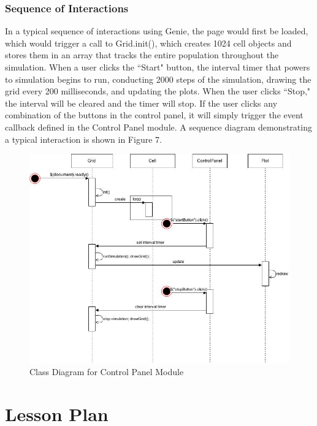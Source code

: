 \documentclass[12pt]{article}
\begin{document}
\begin{spacing}{1.6}
\subsubsection{Sequence of Interactions}
In a typical sequence of interactions using Genie, the page would first be loaded, which would trigger a call to Grid.init(), which creates 1024 cell objects and stores them in an array that tracks the entire population throughout the simulation. When a user clicks the ``Start" button, the interval timer that powers to simulation begins to run, conducting 2000 steps of the simulation, drawing the grid every 200 milliseconds, and updating the plots. When the user clicks ``Stop," the interval will be cleared and the timer will stop. If the user clicks any combination of the buttons in the control panel, it will simply trigger the event callback defined in the Control Panel module. A sequence diagram demonstrating a typical interaction is shown in Figure 7.
\begin{figure}[h]
\caption{Class Diagram for Control Panel Module}
\centering
\includegraphics[scale=0.5]{sequence-diagram}
\end{figure}

\section{Lesson Plan}


\end{spacing}
\end{document}
